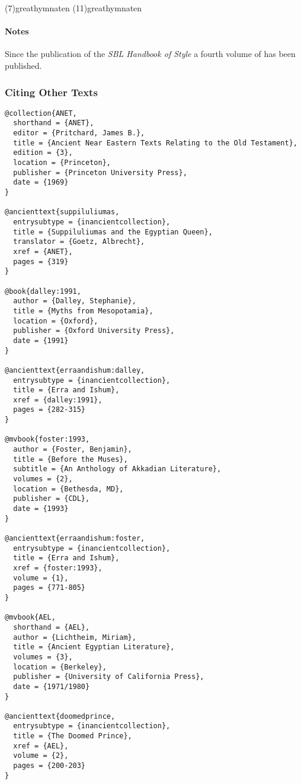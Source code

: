 \documentclass[a4paper]{article}
\begin{document}
\examplecite[atrans](7){greathymnaten}
\examplecite(11){greathymnaten}
\exampleabbreviations

\paragraph{Notes}

Since the publication of the \emph{SBL Handbook of Style} a fourth volume of
\cite{COS} has been published.

\newrefsection

\subsubsection{Citing Other Texts}

\begin{verbatim}
@collection{ANET,
  shorthand = {ANET},
  editor = {Pritchard, James B.},
  title = {Ancient Near Eastern Texts Relating to the Old Testament},
  edition = {3},
  location = {Princeton},
  publisher = {Princeton University Press},
  date = {1969}
}

@ancienttext{suppiluliumas,
  entrysubtype = {inancientcollection},
  title = {Suppiluliumas and the Egyptian Queen},
  translator = {Goetz, Albrecht},
  xref = {ANET},
  pages = {319}
}

@book{dalley:1991,
  author = {Dalley, Stephanie},
  title = {Myths from Mesopotamia},
  location = {Oxford},
  publisher = {Oxford University Press},
  date = {1991}
}

@ancienttext{erraandishum:dalley,
  entrysubtype = {inancientcollection},
  title = {Erra and Ishum},
  xref = {dalley:1991},
  pages = {282-315}
}

@mvbook{foster:1993,
  author = {Foster, Benjamin},
  title = {Before the Muses},
  subtitle = {An Anthology of Akkadian Literature},
  volumes = {2},
  location = {Bethesda, MD},
  publisher = {CDL},
  date = {1993}
}

@ancienttext{erraandishum:foster,
  entrysubtype = {inancientcollection},
  title = {Erra and Ishum},
  xref = {foster:1993},
  volume = {1},
  pages = {771-805}
}

@mvbook{AEL,
  shorthand = {AEL},
  author = {Lichtheim, Miriam},
  title = {Ancient Egyptian Literature},
  volumes = {3},
  location = {Berkeley},
  publisher = {University of California Press},
  date = {1971/1980}
}

@ancienttext{doomedprince,
  entrysubtype = {inancientcollection},
  title = {The Doomed Prince},
  xref = {AEL},
  volume = {2},
  pages = {200-203}
}


\end{verbatim}
\end{document}
